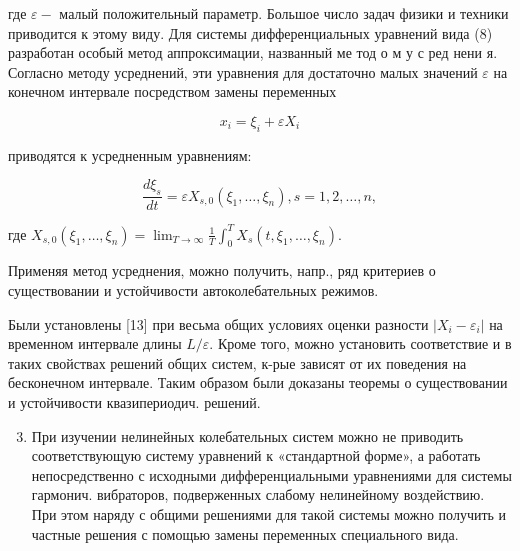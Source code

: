 \documentclass[10pt]{article}
\begin{document}
где $\varepsilon-$ малый положительный параметр. Большое число задач физики и техники приводится к этому виду. Для системы дифференциальных уравнений вида (8) разработан особый метод аппроксимации, названный ме тод о м у с ред нени я. Согласно методу усреднений, эти уравнения для достаточно малых значений $\varepsilon$ на конечном интервале посредством замены переменных



\[

x_{i}=\xi_{i}+\varepsilon X_{i}

\]



приводятся к усредненным уравнениям:



\[

\frac{d \xi_{s}}{d t}=\varepsilon X_{s, 0}\left(\xi_{1}, \ldots, \xi_{n}\right), s=1,2, \ldots, n,

\]



где $X_{s, 0}\left(\xi_{1}, \ldots, \xi_{n}\right)=\lim _{T \rightarrow \infty} \frac{1}{T} \int_{0}^{T} X_{s}\left(t, \xi_{1}, \ldots, \xi_{n}\right)$.



Применяя метод усреднения, можно получить, напр., ряд критериев о существовании и устойчивости автоколебательных режимов.



Были установлены [13] при весьма общих условиях оценки разности $\left|X_{i}-\varepsilon_{i}\right|$ на временном интервале длины $L / \varepsilon$. Кроме того, можно установить соответствие и в таких свойствах решений общих систем, к-рые зависят от их поведения на бесконечном интервале. Таким образом были доказаны теоремы о существовании и устойчивости квазипериодич. решений.



\begin{enumerate}

  \setcounter{enumi}{2}

  \item При изучении нелинейных колебательных систем можно не приводить соответствующую систему уравнений к «стандартной форме», а работать непосредственно с исходными дифференциальными уравнениями для системы гармонич. вибраторов, подверженных слабому нелинейному воздействию. При этом наряду с общими решениями для такой системы можно получить и частные решения с помощью замены переменных специального вида.

\end{enumerate}
\end{document}
